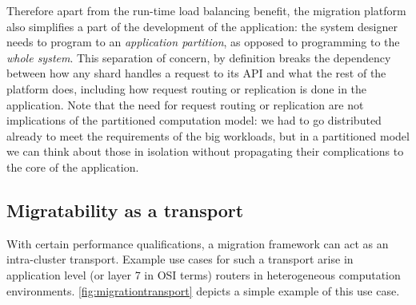 Therefore apart from the run-time load balancing benefit, the
    migration platform also simplifies a part of the development of the
    application: the system designer needs to program to an
    \emph{application partition}, as opposed to programming to the
    \emph{whole system}. This separation of concern,
    by definition breaks the dependency between how
    any shard handles a request to its API and what the rest of the
    platform does, including how request routing or replication is done
    in the application. Note that the need for request routing or
    replication are not implications of the partitioned computation
    model: we had to go distributed already to meet the requirements of
    the big workloads, but in a partitioned model we can think about those
    in isolation without propagating their complications to the
    core of the application.


\subsection{Migratability as a transport}
With certain performance qualifications, a migration framework can act as
an intra-cluster transport. Example use cases for such a transport arise
in application level (or layer 7 in OSI terms) routers in heterogeneous
computation environments. \autoref{fig:migrationtransport} depicts
a simple example of this use case. 

